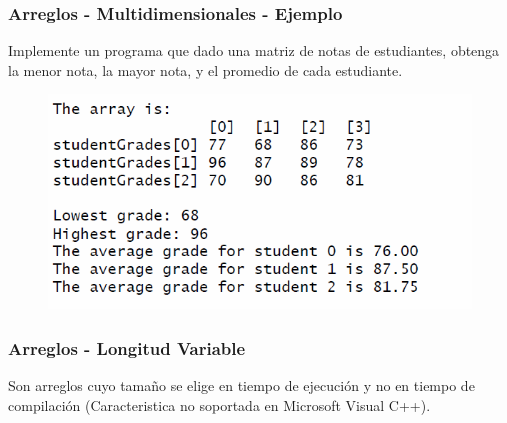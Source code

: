 \documentclass[10.5pt,scale=1.0,t,aspectratio=169,hyperref={pdfpagelabels=false}]{beamer}
\begin{document}
\begin{frame}
	\frametitle{Arreglos - Multidimensionales - Ejemplo}
	Implemente un programa que dado una matriz de notas de estudiantes, obtenga la menor nota, la mayor nota, y el promedio de cada estudiante. 
	
	\begin{figure}
		\centering
		\includegraphics[scale=0.7]{EjemploNotas}
	\end{figure}
\end{frame}
\begin{frame}
	\frametitle{Arreglos - Longitud Variable}
	Son arreglos cuyo tamaño se elige en tiempo de ejecución y no en tiempo de compilación (Caracteristica no soportada en Microsoft Visual C++).  
\end{frame}
\frame{
\begin{center}
	\LARGE \textcolor{blue}{ARREGLOS EN C}
\end{center}

\begin{center}
	\LARGE \textcolor{blue}{GRACIAS}
\end{center}
}

\end{document}
